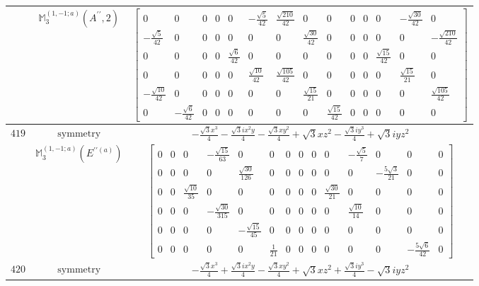 \documentclass[fleqn,8pt,landscape]{jsarticle}
\begin{document}
\begin{longtable}{ccc}
$  $ & $ \mathbb{M}_{3}^{(1,-1;a)}(A^{\prime\prime},2) $ & $ \begin{bmatrix} 0 & 0 & 0 & 0 & 0 & - \frac{\sqrt{5}}{42} & \frac{\sqrt{210}}{42} & 0 & 0 & 0 & 0 & 0 & - \frac{\sqrt{30}}{42} & 0 \\ - \frac{\sqrt{5}}{42} & 0 & 0 & 0 & 0 & 0 & 0 & \frac{\sqrt{30}}{42} & 0 & 0 & 0 & 0 & 0 & - \frac{\sqrt{210}}{42} \\ 0 & 0 & 0 & 0 & \frac{\sqrt{6}}{42} & 0 & 0 & 0 & 0 & 0 & 0 & \frac{\sqrt{15}}{42} & 0 & 0 \\ 0 & 0 & 0 & 0 & 0 & \frac{\sqrt{10}}{42} & \frac{\sqrt{105}}{42} & 0 & 0 & 0 & 0 & 0 & \frac{\sqrt{15}}{21} & 0 \\ - \frac{\sqrt{10}}{42} & 0 & 0 & 0 & 0 & 0 & 0 & \frac{\sqrt{15}}{21} & 0 & 0 & 0 & 0 & 0 & \frac{\sqrt{105}}{42} \\ 0 & - \frac{\sqrt{6}}{42} & 0 & 0 & 0 & 0 & 0 & 0 & \frac{\sqrt{15}}{42} & 0 & 0 & 0 & 0 & 0 \end{bmatrix} $ \\ \hline
$ 419 $ & $ \text{symmetry} $ & $ - \frac{\sqrt{3} x^{3}}{4} - \frac{\sqrt{3} i x^{2} y}{4} - \frac{\sqrt{3} x y^{2}}{4} + \sqrt{3} x z^{2} - \frac{\sqrt{3} i y^{3}}{4} + \sqrt{3} i y z^{2} $ \\
$  $ & $ \mathbb{M}_{3}^{(1,-1;a)}(E^{\prime\prime(a)}) $ & $ \begin{bmatrix} 0 & 0 & 0 & - \frac{\sqrt{15}}{63} & 0 & 0 & 0 & 0 & 0 & 0 & - \frac{\sqrt{5}}{7} & 0 & 0 & 0 \\ 0 & 0 & 0 & 0 & \frac{\sqrt{30}}{126} & 0 & 0 & 0 & 0 & 0 & 0 & - \frac{5 \sqrt{3}}{21} & 0 & 0 \\ 0 & 0 & \frac{\sqrt{10}}{35} & 0 & 0 & 0 & 0 & 0 & 0 & \frac{\sqrt{30}}{21} & 0 & 0 & 0 & 0 \\ 0 & 0 & 0 & - \frac{\sqrt{30}}{315} & 0 & 0 & 0 & 0 & 0 & 0 & \frac{\sqrt{10}}{14} & 0 & 0 & 0 \\ 0 & 0 & 0 & 0 & - \frac{\sqrt{15}}{45} & 0 & 0 & 0 & 0 & 0 & 0 & 0 & 0 & 0 \\ 0 & 0 & 0 & 0 & 0 & \frac{1}{21} & 0 & 0 & 0 & 0 & 0 & 0 & - \frac{5 \sqrt{6}}{42} & 0 \end{bmatrix} $ \\ \hline
$ 420 $ & $ \text{symmetry} $ & $ - \frac{\sqrt{3} x^{3}}{4} + \frac{\sqrt{3} i x^{2} y}{4} - \frac{\sqrt{3} x y^{2}}{4} + \sqrt{3} x z^{2} + \frac{\sqrt{3} i y^{3}}{4} - \sqrt{3} i y z^{2} $ \\

\end{longtable}
\end{document}
